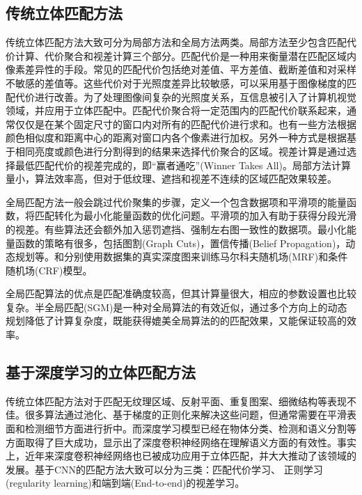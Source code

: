 \subsection{传统立体匹配方法}
传统立体匹配方法大致可分为局部方法和全局方法两类。局部方法至少包含匹配代价计算、代价聚合和视差计算三个部分。匹配代价是一种用来衡量潜在匹配区域内像素差异性的手段。常见的匹配代价包括绝对差值、平方差值、截断差值和对采样不敏感的差值\cite{Birchfield1999}等。这些代价对于光照度差异比较敏感，可以采用基于图像梯度的匹配代价进行改善\cite{SGM_3}。为了处理图像间复杂的光照度关系，互信息被引入了计算机视觉领域\cite{Viola1997}，并应用于立体匹配中\cite{SGM_6}。匹配代价聚合将一定范围内的匹配代价联系起来，通常仅仅是在某个固定尺寸的窗口内对所有的匹配代价进行求和\cite{Hirschmüller2002}。也有一些方法根据颜色相似度和距离中心的距离对窗口内各个像素进行加权\cite{SGM_10}。另外一种方式是根据基于相同亮度或颜色进行分割得到的结果来选择代价聚合的区域\cite{Zitnick2004}。视差计算是通过选择最低匹配代价的视差完成的\cite{Hirschmüller2002}，即“赢者通吃”(Winner Takes All)。局部方法计算量小，算法效率高，但对于低纹理、遮挡和视差不连续的区域匹配效果较差。

全局匹配方法一般会跳过代价聚集的步骤，定义一个包含数据项和平滑项的能量函数，将匹配转化为最小化能量函数的优化问题。平滑项的加入有助于获得分段光滑的视差。有些算法还会额外加入惩罚遮挡\cite{SGM_13}、强制左右图一致性\cite{Zitnick2004}的数据项。最小化能量函数的策略有很多，包括图割(Graph Cuts)\cite{SGM_13}，置信传播(Belief Propagation)\cite{SGM_3}，动态规划\cite{VanMeerbergen2002}等。\cite{MRF}和\cite{CRF}分别使用数据集的真实深度图来训练马尔科夫随机场(MRF)和条件随机场(CRF)模型。

全局匹配算法的优点是匹配准确度较高，但其计算量很大，相应的参数设置也比较复杂。半全局匹配(SGM)\cite{Hirschmuller08}是一种对全局算法的有效近似，通过多个方向上的动态规划降低了计算复杂度，既能获得媲美全局算法的的匹配效果，又能保证较高的效率。

\subsection{基于深度学习的立体匹配方法}
传统立体匹配方法对于匹配无纹理区域、反射平面、重复图案、细微结构等表现不佳。很多算法通过池化、基于梯度的正则化\cite{geiger2010efficient, hirschmuller2005accurate}来解决这些问题，但通常需要在平滑表面和检测细节方面进行折中。而深度学习模型已经在物体分类\cite{krizhevsky2012imagenet}、检测\cite{girshick2014rich}和语义分割\cite{badrinarayanan2015segnet}等方面取得了巨大成功，显示出了深度卷积神经网络在理解语义方面的有效性。事实上，近年来深度卷积神经网络也已被成功应用于立体匹配，并大大推动了该领域的发展。基于CNN的匹配方法大致可以分为三类：匹配代价学习、
正则学习(regularity learning)和端到端(End-to-end)的视差学习。


